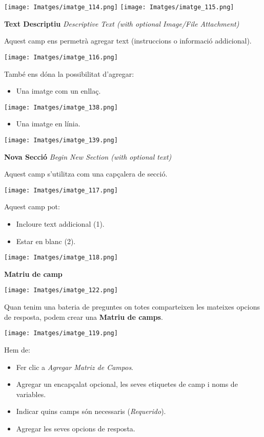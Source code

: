 \documentclass[
]{article}
\providecommand{\tightlist}{%
  \setlength{\itemsep}{0pt}\setlength{\parskip}{0pt}}
\begin{document}
\texttt{[image: Imatges/imatge\_114.png]}
\texttt{[image: Imatges/imatge\_115.png]}

\textbf{Text Descriptiu} \emph{Descriptive Text (with optional Image/File Attachment)}

Aquest camp ens permetrà agregar text (instruccions o informació addicional).

\texttt{[image: Imatges/imatge\_116.png]}

També ens dóna la possibilitat d'agregar:

\begin{itemize}
\tightlist
\item
  Una imatge com un enllaç.
\end{itemize}

\texttt{[image: Imatges/imatge\_138.png]}

\begin{itemize}
\tightlist
\item
  Una imatge en línia.
\end{itemize}

\texttt{[image: Imatges/imatge\_139.png]}

\textbf{Nova Secció} \emph{Begin New Section (with optional text)}

Aquest camp s'utilitza com una capçalera de secció.

\texttt{[image: Imatges/imatge\_117.png]}

Aquest camp pot:

\begin{itemize}
\tightlist
\item
  Incloure text addicional (1).
\item
  Estar en blanc (2).
\end{itemize}

\texttt{[image: Imatges/imatge\_118.png]}

\textbf{Matriu de camp}

\texttt{[image: Imatges/imatge\_122.png]}

Quan tenim una bateria de preguntes on totes comparteixen les mateixes opcions de resposta, podem crear una \textbf{Matriu de camps}.

\texttt{[image: Imatges/imatge\_119.png]}

Hem de:

\begin{itemize}
\tightlist
\item
  Fer clic a \emph{Agregar Matriz de Campos}.
\item
  Agregar un encapçalat opcional, les seves etiquetes de camp i noms de variables.
\item
  Indicar quins camps són necessaris (\emph{Requerido}).
\item
  Agregar les seves opcions de resposta.
\end{itemize}
\end{document}
